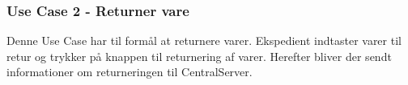 \subsubsection{Use Case 2 - Returner vare}
Denne Use Case har til formål at returnere varer. Ekspedient indtaster varer til retur og trykker på knappen til returnering af varer. Herefter bliver der sendt informationer om returneringen til CentralServer.